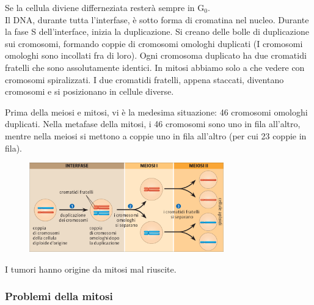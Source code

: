 \documentclass[a4paper]{article}
\begin{document}
Se la cellula diviene differneziata resterà sempre in G\({}_0\).
\\
Il DNA, durante tutta l'interfase, è sotto forma di cromatina nel nucleo.
Durante la fase S dell'interface, inizia la duplicazione.
Si creano delle bolle di duplicazione sui cromosomi, formando
coppie di cromosomi omologhi duplicati (I cromosomi omologhi sono incollati fra di loro).
Ogni cromosoma duplicato ha due cromatidi fratelli che sono assolutamente identici.
In mitosi abbiamo solo a che vedere con cromosomi spiralizzati.
I due cromatidi fratelli, appena staccati, diventano cromosomi e si posizionano in cellule diverse.

Prima della meiosi e mitosi, vi è la medesima situazione: 46 cromosomi omologhi duplicati.
Nella metafase della mitosi, i 46 cromosomi sono uno in fila all'altro,
mentre nella meiosi si mettono a coppie uno in fila all'altro (per cui 23 coppie in fila).


\vspace{0.25cm}

\begin{center}
\begin{figure}[ht]
    \centering
    \includegraphics[width=0.75\textwidth]{./meiosi_schema}
\end{figure}
\end{center}


I tumori hanno origine da mitosi mal riuscite.

\subsubsection{Problemi della mitosi}

\end{document}
